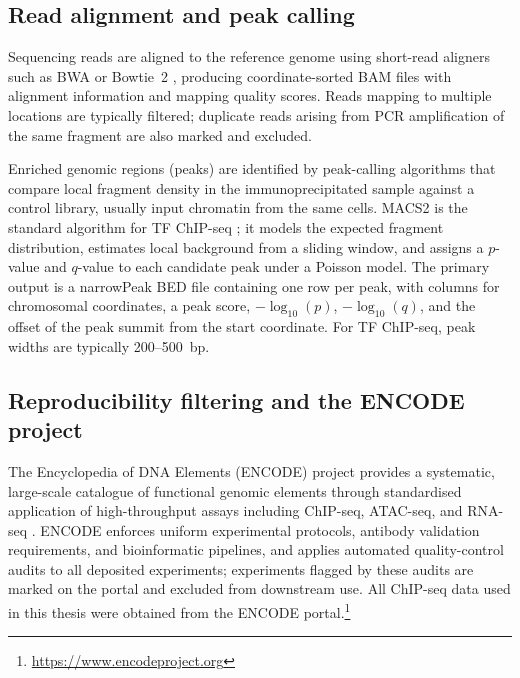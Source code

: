 \subsection{Read alignment and peak calling}

Sequencing reads are aligned to the reference genome using short-read aligners such as BWA \cite{liAligningSequenceReads2013} or Bowtie~2 \cite{langmeadFastGappedreadAlignment2012}, producing coordinate-sorted BAM files with alignment information and mapping quality scores.
Reads mapping to multiple locations are typically filtered; duplicate reads arising from PCR amplification of the same fragment are also marked and excluded.

Enriched genomic regions (peaks) are identified by peak-calling algorithms that compare local fragment density in the immunoprecipitated sample against a control library, usually input chromatin from the same cells.
MACS2 is the standard algorithm for TF ChIP-seq \cite{zhangModelbasedAnalysisChIPSeq2008};
it models the expected fragment distribution, estimates local background from a sliding window, and assigns a $p$-value and $q$-value to each candidate peak under a Poisson model.
The primary output is a narrowPeak BED file containing one row per peak, with columns for chromosomal coordinates, a peak score, $-\log_{10}(p)$, $-\log_{10}(q)$, and the offset of the peak summit from the start coordinate.
For TF ChIP-seq, peak widths are typically 200--500~bp.

\subsection{Reproducibility filtering and the ENCODE project}
\label{sec:encode-idr}

The Encyclopedia of DNA Elements (ENCODE) project provides a systematic, large-scale catalogue of functional genomic elements through standardised application of high-throughput assays including ChIP-seq, ATAC-seq, and RNA-seq \cite{dunhamIntegratedEncyclopediaDNA2012}.
ENCODE enforces uniform experimental protocols, antibody validation requirements, and bioinformatic pipelines, and applies automated quality-control audits to all deposited experiments; experiments flagged by these audits are marked on the portal and excluded from downstream use.
All ChIP-seq data used in this thesis were obtained from the ENCODE portal.\footnote{\url{https://www.encodeproject.org}}

